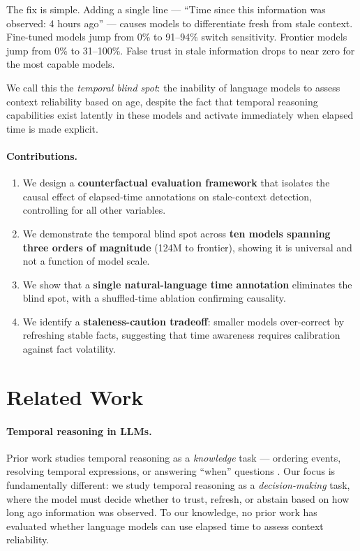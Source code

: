 \documentclass[11pt,a4paper]{article}
\begin{document}
The fix is simple.
Adding a single line --- ``Time since this information was observed: 4 hours ago'' --- causes models to differentiate fresh from stale context.
Fine-tuned models jump from 0\% to 91--94\% switch sensitivity.
Frontier models jump from 0\% to 31--100\%.
False trust in stale information drops to near zero for the most capable models.

We call this the \emph{temporal blind spot}: the inability of language models to assess context reliability based on age, despite the fact that temporal reasoning capabilities exist latently in these models and activate immediately when elapsed time is made explicit.

\paragraph{Contributions.}
\begin{enumerate}
    \item We design a \textbf{counterfactual evaluation framework} that isolates the causal effect of elapsed-time annotations on stale-context detection, controlling for all other variables.
    \item We demonstrate the temporal blind spot across \textbf{ten models spanning three orders of magnitude} (124M to frontier), showing it is universal and not a function of model scale.
    \item We show that a \textbf{single natural-language time annotation} eliminates the blind spot, with a shuffled-time ablation confirming causality.
    \item We identify a \textbf{staleness-caution tradeoff}: smaller models over-correct by refreshing stable facts, suggesting that time awareness requires calibration against fact volatility.
\end{enumerate}

\section{Related Work}
\label{sec:related}

\paragraph{Temporal reasoning in LLMs.}
Prior work studies temporal reasoning as a \emph{knowledge} task --- ordering events, resolving temporal expressions, or answering ``when'' questions \citep{ning2018multi,zhou2019going}.
Our focus is fundamentally different: we study temporal reasoning as a \emph{decision-making} task, where the model must decide whether to trust, refresh, or abstain based on how long ago information was observed.
To our knowledge, no prior work has evaluated whether language models can use elapsed time to assess context reliability.
\end{document}
